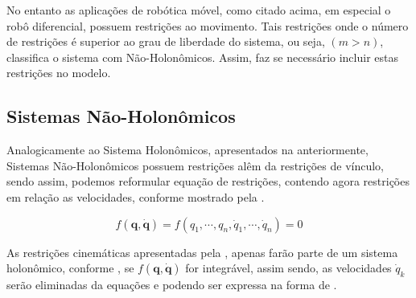 
        


No entanto as aplicações de robótica móvel, como citado acima, em especial o robô diferencial, possuem restrições ao movimento. Tais restrições onde o número de restrições é superior ao grau de liberdade do sistema, ou seja,
 $(m>n)$, classifica o sistema com Não-Holonômicos. Assim, faz se necessário incluir estas restrições no modelo.


\subsection{Sistemas Não-Holonômicos}

Analogicamente ao Sistema Holonômicos, apresentados na anteriormente, Sistemas Não-Holonômicos possuem restrições alêm da restrições de vínculo, sendo assim, podemos reformular equação de restrições, contendo
agora restrições em relação as velocidades, conforme mostrado pela .

\begin{equation}
    f(\mathbf{q}, \dot{\mathbf{q}}) = f(q_1, \cdots, q_n, \dot{q}_1, \cdots, \dot{q}_n) = 0
    \label{eq:nonhomo}
\end{equation}

As restrições cinemáticas apresentadas pela , apenas farão parte de um sistema holonômico, conforme \cite{klancar2017wheeled}, se $f(\mathbf{q}, \dot{\mathbf{q}})$ for integrável, assim sendo, as velocidades
$\dot{q}_k$ serão eliminadas da equações e  podendo ser expressa na forma de .

